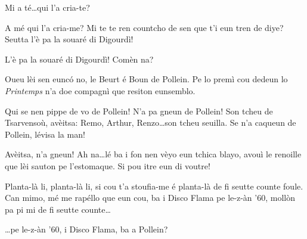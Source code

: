 \begin{drama}
\Laurentspeaks{} Mi a té\ldots qui l'a cria-te?

\Taniaspeaks A mé qui l'a cria-me? Mi te te ren countcho de sen que t'i eun tren de diye? Seutta l'è pa la souaré di Digourdì!

\Laurentspeaks{} L'è pa la souaré di Digourdì! Comèn na?

\Taniaspeaks Oueu lèi sen eunc\'o no, le Beurt é Boun de Pollein. Pe lo premì cou dedeun lo \textit{Printemps} n'a doe compagnì que resiton eunsemblo.

\Laurentspeaks Qui se nen pippe de vo de Pollein! N'a pa gneun de Pollein! Son tcheu de Tsarvensoù, avèitsa: Remo, Arthur, Renzo\ldots son tcheu seuilla. Se n'a caqueun de Pollein, lévisa la man!


\Laurentspeaks Avèitsa, n'a gneun! Ah na\ldots lé ba i fon nen vèyo eun tchica blayo, avouì le renoille que lèi sauton pe l'estomaque. Si pou itre eun di voutre!

\Laurentspeaks Planta-là li, planta-là li, si cou t'a stoufia-me é planta-là de fi seutte counte foule. Can mimo, mé me rapéllo que eun cou, ba i Disco Flama pe le-z-àn '60, mollòn pa pi mi de fi seutte counte\ldots

\Laurentspeaks \ldots pe le-z-àn '60, i Disco Flama, ba a Pollein?


\act[Le-z-àn '60]

\ridoiver





\end{drama}

